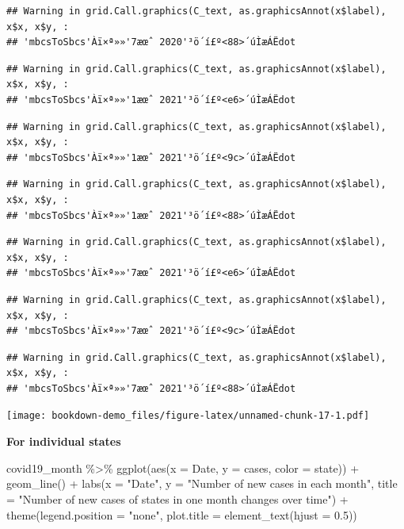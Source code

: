 \documentclass[
]{book}
\newenvironment{Shaded}{\begin{snugshade}}{\end{snugshade}}
\newcommand{\AttributeTok}[1]{\textcolor[rgb]{0.77,0.63,0.00}{#1}}
\newcommand{\FloatTok}[1]{\textcolor[rgb]{0.00,0.00,0.81}{#1}}
\newcommand{\FunctionTok}[1]{\textcolor[rgb]{0.00,0.00,0.00}{#1}}
\newcommand{\NormalTok}[1]{#1}
\newcommand{\SpecialCharTok}[1]{\textcolor[rgb]{0.00,0.00,0.00}{#1}}
\newcommand{\StringTok}[1]{\textcolor[rgb]{0.31,0.60,0.02}{#1}}
\begin{document}
\begin{verbatim}
## Warning in grid.Call.graphics(C_text, as.graphicsAnnot(x$label), x$x, x$y, :
## 'mbcsToSbcs'Àï×ª»»'7æœˆ 2020'³ö´í£º<88>´úÌæÁËdot
\end{verbatim}

\begin{verbatim}
## Warning in grid.Call.graphics(C_text, as.graphicsAnnot(x$label), x$x, x$y, :
## 'mbcsToSbcs'Àï×ª»»'1æœˆ 2021'³ö´í£º<e6>´úÌæÁËdot
\end{verbatim}

\begin{verbatim}
## Warning in grid.Call.graphics(C_text, as.graphicsAnnot(x$label), x$x, x$y, :
## 'mbcsToSbcs'Àï×ª»»'1æœˆ 2021'³ö´í£º<9c>´úÌæÁËdot
\end{verbatim}

\begin{verbatim}
## Warning in grid.Call.graphics(C_text, as.graphicsAnnot(x$label), x$x, x$y, :
## 'mbcsToSbcs'Àï×ª»»'1æœˆ 2021'³ö´í£º<88>´úÌæÁËdot
\end{verbatim}

\begin{verbatim}
## Warning in grid.Call.graphics(C_text, as.graphicsAnnot(x$label), x$x, x$y, :
## 'mbcsToSbcs'Àï×ª»»'7æœˆ 2021'³ö´í£º<e6>´úÌæÁËdot
\end{verbatim}

\begin{verbatim}
## Warning in grid.Call.graphics(C_text, as.graphicsAnnot(x$label), x$x, x$y, :
## 'mbcsToSbcs'Àï×ª»»'7æœˆ 2021'³ö´í£º<9c>´úÌæÁËdot
\end{verbatim}

\begin{verbatim}
## Warning in grid.Call.graphics(C_text, as.graphicsAnnot(x$label), x$x, x$y, :
## 'mbcsToSbcs'Àï×ª»»'7æœˆ 2021'³ö´í£º<88>´úÌæÁËdot
\end{verbatim}

\texttt{[image: bookdown-demo\_files/figure-latex/unnamed-chunk-17-1.pdf]}

\textbf{For individual states}

\begin{Shaded}
\begin{Highlighting}[]
\NormalTok{covid19\_month }\SpecialCharTok{\%\textgreater{}\%}
  \FunctionTok{ggplot}\NormalTok{(}\FunctionTok{aes}\NormalTok{(}\AttributeTok{x =}\NormalTok{ Date, }\AttributeTok{y =}\NormalTok{ cases, }\AttributeTok{color =}\NormalTok{ state)) }\SpecialCharTok{+}
  \FunctionTok{geom\_line}\NormalTok{() }\SpecialCharTok{+} 
  \FunctionTok{labs}\NormalTok{(}\AttributeTok{x =} \StringTok{"Date"}\NormalTok{, }\AttributeTok{y =} \StringTok{"Number of new cases in each month"}\NormalTok{, }\AttributeTok{title =} \StringTok{"Number of new cases of states in one month changes over time"}\NormalTok{) }\SpecialCharTok{+}
  \FunctionTok{theme}\NormalTok{(}\AttributeTok{legend.position =} \StringTok{"none"}\NormalTok{, }\AttributeTok{plot.title =} \FunctionTok{element\_text}\NormalTok{(}\AttributeTok{hjust =} \FloatTok{0.5}\NormalTok{))}
\end{Highlighting}
\end{Shaded}
\end{document}
